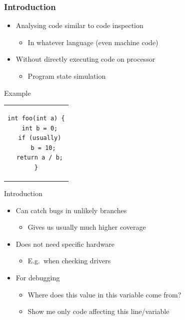 \begin{frame}[fragile]
  \frametitle{Introduction}

  \begin{itemize}
    \item Analysing code similar to code inspection
    \begin{itemize}
      \item In whatever language (even machine code)
    \end{itemize}

    \pause

    \item Without directly executing code on processor
    \begin{itemize}
      \item Program state simulation
    \end{itemize}
  \end{itemize}

  \pause
  \bigskip

  \begin{block}{Example}
    \begin{center}
    \begin{tabular}{c}
    \begin{lstlisting}
int foo(int a) {
  int b = 0;
  if (usually)
    b = 10;
  return a / b;
}
    \end{lstlisting}
    \end{tabular}
    \end{center}
  \end{block}

\end{frame}

\begin{frame}{Introduction}

  \begin{itemize}
    \item Can catch bugs in unlikely branches
    \begin{itemize}
      \item Gives us usually much higher coverage
    \end{itemize}

    \pause

    \item Does not need specific hardware
    \begin{itemize}
      \item E.g.\ when checking drivers
    \end{itemize}

    \pause

    \item For debugging
    \begin{itemize}
      \item Where does this value in this variable come from?
      \item Show me only code affecting this line/variable
    \end{itemize}

  \end{itemize}

\end{frame}

